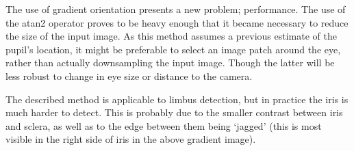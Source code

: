 The use of gradient orientation presents a new problem; performance. The use of
the atan2 operator proves to be heavy enough that it became necessary to reduce
the size of the input image. As this method assumes a previous estimate of the
pupil’s location, it might be preferable to select an image patch around the
eye, rather than actually downsampling the input image. Though the latter will
be less robust to change in eye size or distance to the camera.

The described method is applicable to limbus detection, but in practice the
iris is much harder to detect. This is probably due to the smaller contrast
between iris and sclera, as well as to the edge between them being ‘jagged’
(this is most visible in the right side of iris in the above gradient image).
